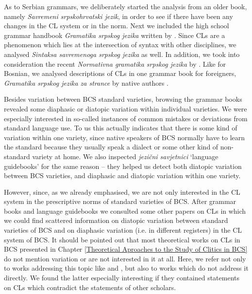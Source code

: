 As to Serbian grammars, we deliberately started the analysis from an older book, namely  \textit{Savremeni srpskohrvatski jezik}, in order to see if there have been any changes in the CL system or in the norm. Next we included the high school grammar handbook \textit{Gramatika srpskog jezika} written by \citet{StanojcicPopovic02}. Since CLs are a phenomenon which lies at the intersection of syntax with other disciplines, we analysed \textit{Sintaksa savremenoga srpskog jezika} \citep{PiperIvic05} as well. In addition, we took into consideration the recent \textit{Normativna gramatika srpskog jezika} by \citet{PiperKlajn14}. Like for Bosnian, we analysed descriptions of CLs in one grammar book for foreigners, \textit{Gramatika srpskog jezika za strance} by native authors \citet{MrazovicVukadinovic09}.  

\hspace*{-1.5mm}Besides variation between BCS standard varieties, browsing the grammar books revealed some diaphasic or diatopic variation within individual varieties. We were especially interested in so-called instances of common mistakes or deviations from standard language use. To us this actually indicates that there is some kind of variation within one variety, since native speakers of BCS normally have to learn the standard because they usually speak a dialect or some other kind of non-standard variety at home. We also inspected \textit{jezični savjetnici} `language guidebooks' for the same reason – they helped us detect both diatopic variation between BCS varieties, and diaphasic and diatopic variation within one variety.

However, since, as we already emphasised, we are not only interested in the CL system in the prescriptive norms of standard varieties of BCS. After grammar books and language guidebooks we consulted some other papers on CLs in which we could find scattered information on diatopic variation between standard varieties of BCS and on diaphasic variation (i.e. in different registers) in the CL system of BCS. It should be pointed out that most theoretical works on CLs in BCS presented in Chapter \ref{Theoretical Aproaches to the Study of Clitics in BCS} do not mention variation or are not interested in it at all. Here, we refer not only to works addressing this topic like \citet{RadanovicKocic88} and \citet{Milicevic07}, but also to works which do not address it directly. We found the latter especially interesting if they contained statements on CLs which contradict the statements of other scholars.

